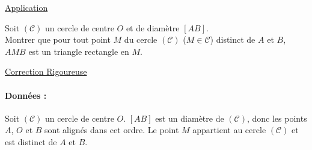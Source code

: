 \documentclass[12pt,a4paper]{article}
\begin{document}
\begin{center}
    \textcolor{monRouge}{\underline{\Large Application}}
\end{center}

\noindent Soit $(\mathcal{C})$ un cercle de centre $O$ et de diamètre $[AB]$. \\
Montrer que pour tout point $M$ du cercle $(\mathcal{C})$ ($M \in \mathcal{C}$) distinct de $A$ et $B$, $AMB$ est un triangle rectangle en $M$.

\begin{center}
\end{center}

\begin{center}
    \textcolor{monRouge}{\underline{\Large Correction Rigoureuse}}
\end{center}

\paragraph{Données :} 
Soit $(\mathcal{C})$ un cercle de centre $O$. $[AB]$ est un diamètre de $(\mathcal{C})$, donc les points $A$, $O$ et $B$ sont alignés dans cet ordre. Le point $M$ appartient au cercle $(\mathcal{C})$ et est distinct de $A$ et $B$.
\end{document}
